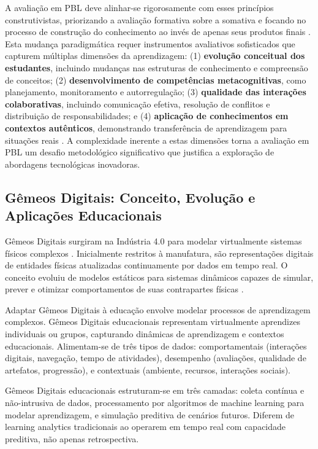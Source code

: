 \documentclass[english, spanish, brazilian]{RBIEarticle} %
\begin{document}
A avaliação em PBL deve alinhar-se rigorosamente com esses princípios construtivistas, priorizando a avaliação formativa sobre a somativa e focando no processo de construção do conhecimento ao invés de apenas seus produtos finais \parencite{Stiggins2005}. Esta mudança paradigmática requer instrumentos avaliativos sofisticados que capturem múltiplas dimensões da aprendizagem: (1) \textbf{evolução conceitual dos estudantes}, incluindo mudanças nas estruturas de conhecimento e compreensão de conceitos; (2) \textbf{desenvolvimento de competências metacognitivas}, como planejamento, monitoramento e autorregulação; (3) \textbf{qualidade das interações colaborativas}, incluindo comunicação efetiva, resolução de conflitos e distribuição de responsabilidades; e (4) \textbf{aplicação de conhecimentos em contextos autênticos}, demonstrando transferência de aprendizagem para situações reais \parencite{Helle2006}. A complexidade inerente a estas dimensões torna a avaliação em PBL um desafio metodológico significativo que justifica a exploração de abordagens tecnológicas inovadoras.

\subsection{Gêmeos Digitais: Conceito, Evolução e Aplicações Educacionais}

Gêmeos Digitais surgiram na Indústria 4.0 para modelar virtualmente sistemas físicos complexos \parencite{Grieves2014}. Inicialmente restritos à manufatura, são representações digitais de entidades físicas atualizadas continuamente por dados em tempo real. O conceito evoluiu de modelos estáticos para sistemas dinâmicos capazes de simular, prever e otimizar comportamentos de suas contrapartes físicas \parencite{Tao2019}.

Adaptar Gêmeos Digitais à educação envolve modelar processos de aprendizagem complexos. Gêmeos Digitais educacionais representam virtualmente aprendizes individuais ou grupos, capturando dinâmicas de aprendizagem e contextos educacionais. Alimentam-se de três tipos de dados: comportamentais (interações digitais, navegação, tempo de atividades), desempenho (avaliações, qualidade de artefatos, progressão), e contextuais (ambiente, recursos, interações sociais).

Gêmeos Digitais educacionais estruturam-se em três camadas: coleta contínua e não-intrusiva de dados, processamento por algoritmos de machine learning para modelar aprendizagem, e simulação preditiva de cenários futuros. Diferem de learning analytics tradicionais ao operarem em tempo real com capacidade preditiva, não apenas retrospectiva.
\end{document}
